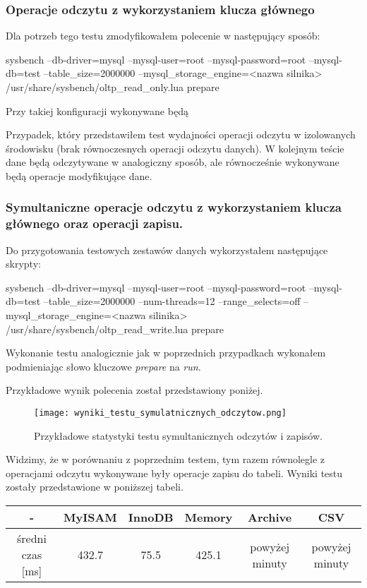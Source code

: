 \subsubsection{Operacje odczytu z wykorzystaniem klucza głównego}
Dla potrzeb tego testu zmodyfikowałem polecenie w następujący sposób:
\begin{spverbatim}
	sysbench --db-driver=mysql --mysql-user=root --mysql-password=root --mysql-db=test --table_size=2000000 --mysql_storage_engine=<nazwa silnika> /usr/share/sysbench/oltp_read_only.lua prepare
\end{spverbatim}
Przy takiej konfiguracji wykonywane będą 



Przypadek, który przedstawiłem test wydajności operacji odczytu w izolowanych środowisku (brak równoczesnych operacji odczytu danych). W kolejnym teście dane będą odczytywane w analogiczny sposób, ale równocześnie wykonywane będą operacje modyfikujące dane.
\subsubsection{Symultaniczne operacje odczytu z wykorzystaniem klucza głównego oraz operacji zapisu.}

Do przygotowania testowych zestawów danych wykorzystałem następujące skrypty:
\begin{spverbatim}
	sysbench --db-driver=mysql --mysql-user=root --mysql-password=root --mysql-db=test --table_size=2000000 --num-threads=12 --range_selects=off --mysql_storage_engine=<nazwa silinika>  /usr/share/sysbench/oltp_read_write.lua prepare
\end{spverbatim}

Wykonanie testu analogicznie jak w poprzednich przypadkach wykonałem podmieniając słowo kluczowe \textit{prepare} na \textit{run}.

Przykładowe wynik polecenia został przedstawiony poniżej.
\begin{figure}[H]
	\caption{Przykładowe statystyki testu symultanicznych odczytów i zapisów.}
	\centering
	\texttt{[image: wyniki\_testu\_symulatnicznych\_odczytow.png]}
	\label{fig:label}
\end{figure}

Widzimy, że w porównaniu z poprzednim testem, tym razem równolegle z operacjami odczytu wykonywane były operacje zapisu do tabeli. Wyniki testu zostały przedstawione w poniższej tabeli.


\begin{center}
	\begin{tabular}{ | c | c | c | c | c | c |}
		\hline
		- & MyISAM & InnoDB & Memory & Archive & CSV  \\ 
		\hline
		średni czas [ms] & 432.7 & 75.5 & 425.1 & powyżej minuty & powyżej minuty \\
		\hline
	\end{tabular}
\end{center}

